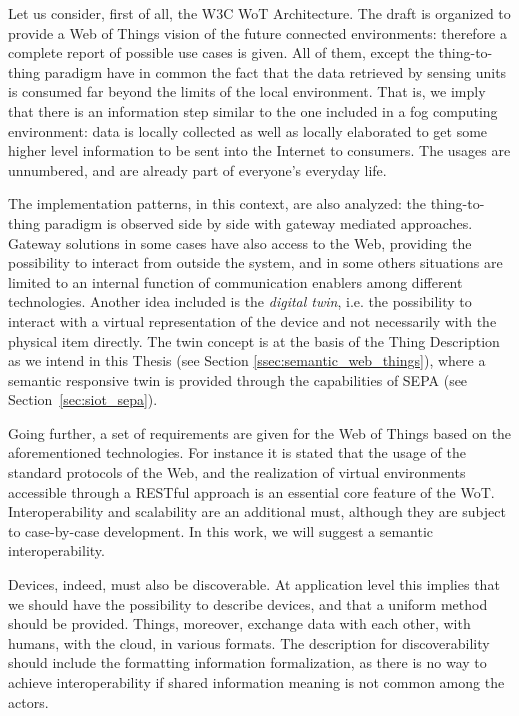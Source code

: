 Let us consider, first of all, the W3C WoT Architecture. The draft is organized to provide a Web of Things vision of the future connected environments: therefore a complete report of possible use cases is given. All of them, except the thing-to-thing paradigm have in common the fact that the data retrieved by sensing units is consumed far beyond the limits of the local environment. That is, we imply that there is an information step similar to the one included in a fog computing \cite{bonomi2012fog} environment: data is locally collected as well as locally elaborated to get some higher level information to be sent into the Internet to consumers. The usages are unnumbered, and are already part of everyone's everyday life.

The implementation patterns, in this context, are also analyzed: the thing-to-thing paradigm is observed side by side with gateway mediated approaches. Gateway solutions in some cases have also access to the Web, providing the possibility to interact from outside the system, and in some others situations are limited to an internal function of communication enablers among different technologies. Another idea included is the \textit{digital twin}, i.e. the possibility to interact with a virtual representation of the device and not necessarily with the physical item directly. The twin concept is at the basis of the Thing Description as we intend in this Thesis (see Section \ref{ssec:semantic_web_things}), where a semantic responsive twin is provided through the capabilities of SEPA (see Section~\ref{sec:siot_sepa}).

Going further, a set of requirements are given for the Web of Things based on the aforementioned technologies. For instance it is stated that the usage of the standard protocols of the Web, and the realization of virtual environments accessible through a RESTful approach is an essential core feature of the WoT. Interoperability and scalability are an additional must, although they are subject to case-by-case development. In this work, we will suggest a semantic interoperability.

Devices, indeed, must also be discoverable. At application level this implies that we should have the possibility to describe devices, and that a uniform method should be provided. Things, moreover, exchange data with each other, with humans, with the cloud, in various formats. The description for discoverability should include the formatting information formalization, as there is no way to achieve interoperability if shared information meaning is not common among the actors.

